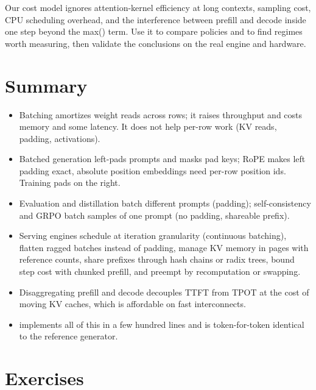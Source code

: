 \begin{pitfall}
Our cost model ignores attention-kernel efficiency at long contexts, sampling cost, CPU scheduling
overhead, and the interference between prefill and decode inside one step beyond the max() term. Use
it to compare policies and to find regimes worth measuring, then validate the conclusions on the real
engine and hardware.
\end{pitfall}

\section{Summary}\label{sec:serving:summary}
\begin{itemize}
  \item Batching amortizes weight reads across rows; it raises throughput and costs memory and some
    latency. It does not help per-row work (KV reads, padding, activations).
  \item Batched generation left-pads prompts and masks pad keys; RoPE makes left padding exact,
    absolute position embeddings need per-row position ids. Training pads on the right.
  \item Evaluation and distillation batch different prompts (padding); self-consistency and GRPO batch
    samples of one prompt (no padding, shareable prefix).
  \item Serving engines schedule at iteration granularity (continuous batching), flatten ragged batches
    instead of padding, manage KV memory in pages with reference counts, share prefixes through hash chains
    or radix trees, bound step cost with chunked prefill, and preempt by recomputation or swapping.
  \item Disaggregating prefill and decode decouples TTFT from TPOT at the cost of moving KV caches, which
    is affordable on fast interconnects.
  \item {} implements all of this in a few hundred lines and is token-for-token
    identical to the reference generator.
\end{itemize}

\section{Exercises}\label{sec:serving:exercises}

